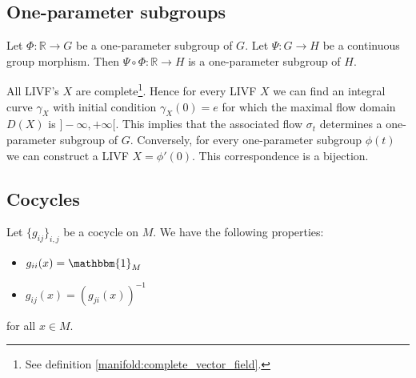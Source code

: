 \subsection{One-parameter subgroups}


        \begin{property}\label{group:OPS_composition}
        	Let $\Phi:\mathbb{R}\rightarrow G$ be a one-parameter subgroup of $G$. Let $\Psi:G\rightarrow H$ be a continuous group morphism. Then $\Psi\circ\Phi:\mathbb{R}\rightarrow H$ is a one-parameter subgroup of $H$.
        \end{property}
        
        \begin{property}\label{lie:livf_subgroup}
        	All LIVF's $X$ are complete\footnote{See definition \ref{manifold:complete_vector_field}.}. Hence for every LIVF $X$ we can find an integral curve $\gamma_X$ with initial condition $\gamma_X(0) = e$ for which the maximal flow domain\footnotemark\ $D(X)$ is $]-\infty, +\infty[$. This implies that the associated flow $\sigma_t$ determines a one-parameter subgroup of $G$. Conversely, for every one-parameter subgroup $\phi(t)$ we can construct a LIVF $X = \phi'(0)$. This correspondence is a bijection.
        \end{property}

\subsection{Cocycles}

	\begin{property}
		Let $\{g_{ij}\}_{i,j}$ be a cocycle on $M$. We have the following properties:
		\begin{itemize}
			\item $g_{ii}(x) = \mathbbm{1}_M$
			\item $g_{ij}(x) = (g_{ji}(x))^{-1}$
		\end{itemize}
		for all $x\in M$.
	\end{property}


